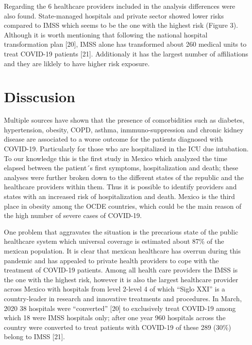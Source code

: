 \documentclass[10pt,letterpaper]{article}
\begin{document}
Regarding the 6 healthcare providers included in the analysis
differences were also found. State-managed hospitals and private sector
showed lower risks compared to IMSS which seems to be the one with the
highest risk (Figure 3). Although it is worth mentioning that following
the national hospital transformation plan {[}20{]}, IMSS alone has
transformed about 260 medical units to treat COVID-19 patients {[}21{]}.
Additionaly it has the largest number of affiliations and they are
liklely to have higher risk exposure.

\hypertarget{disscusion}{%
\section{Disscusion}\label{disscusion}}

Multiple sources have shown that the presence of comorbidities such as
diabetes, hypertension, obesity, COPD, asthma, inmmuno-suppression and
chronic kidney disease are associated to a worse outcome for the
patients diagnosed with COVID-19. Particularly for those who are
hospitalized in the ICU due intubation. To our knowledge this is the
first study in Mexico which analyzed the time elapsed between the
patient´s first symptoms, hospitalization and death; these analyses were
further broken down to the different states of the republic and the
healthcare providers within them. Thus it is possible to identify
providers and states with an increased risk of hospitalization and
death. Mexico is the third place in obesity among the OCDE countries,
which could be the main reason of the high number of severe cases of
COVID-19.

One problem that aggravates the situation is the precarious state of the
public healthcare system which universal coverage is estimated about
87\% of the mexican population. It is clear that mexican healthcare has
overrun during this pandemic and has appealed to private health
providers to cope with the treatment of COVID-19 patients. Among all
health care providers the IMSS is the one with the highest risk, however
it is also the largest healthcare provider across Mexico with hospitals
from level 2-level 4 of which ``Siglo XXI'' is a country-leader in
research and innovative treatments and procedures. In March, 2020 38
hospitals were ``converted'' {[}20{]} to exclusively treat COVID-19
among which 18 were IMSS hospitals only; after one year 960 hospitals
across the country were converted to treat patients with COVID-19 of
these 289 (30\%) belong to IMSS {[}21{]}.
\end{document}
